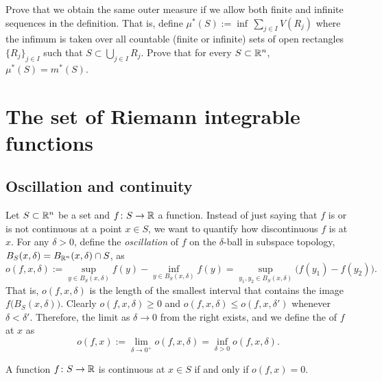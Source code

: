 \begin{exercise} \label{exercise:allowfiniteseqsinoutermeasure}
Prove that we obtain the same outer measure if we allow both finite and
infinite sequences in
the definition.  That is, define $\mu^*(S) := \inf\, \sum_{j \in I} V(R_j)$
where the infimum is taken over all countable (finite or infinite) sets of
open rectangles $\{ R_j \}_{j\in I}$ such that $S \subset
\bigcup_{j \in I} R_j$.  Prove that for every $S \subset {\mathbb{R}}^n$,
$\mu^*(S) = m^*(S)$.
\end{exercise}



\sectionnewpage
\section{The set of Riemann integrable functions }
\label{sec:riemannlebesgue}


\subsection{Oscillation and continuity}

Let $S \subset {\mathbb{R}}^n$ be a set and $f \colon S \to {\mathbb{R}}$ a function.
Instead of just saying that $f$ is or is not continuous at
a point $x \in S$,
we want to quantify how discontinuous $f$ is 
at $x$.  For any $\delta > 0$, define the \emph{oscillation} of 
$f$ on the $\delta$-ball in subspace topology,
$B_S(x,\delta) = B_{{\mathbb{R}}^n}(x,\delta) \cap S$, as
\begin{equation*}
o(f,x,\delta) :=
{\sup_{y \in B_S(x,\delta)} f(y)}
-
{\inf_{y \in B_S(x,\delta)} f(y)}
= 
\sup_{y_1,y_2 \in B_S(x,\delta)} \bigl(f(y_1)-f(y_2)\bigr) .
\end{equation*}
That is, $o(f,x,\delta)$ is the length of the smallest interval
that contains the image $f\bigl(B_S(x,\delta)\bigr)$.
Clearly $o(f,x,\delta) \geq 0$ and
$o(f,x,\delta) \leq o(f,x,\delta')$ whenever $\delta < \delta'$.
Therefore, the limit as $\delta \to 0$ from the right exists, and
we define the \emph{} of $f$
at $x$ as
\begin{equation*}
o(f,x) :=
\lim_{\delta \to 0^+}
o(f,x,\delta) =
\inf_{\delta > 0}
o(f,x,\delta) .
\end{equation*}

\begin{prop}
A function
$f \colon S \to {\mathbb{R}}$ is continuous at $x \in S$ if and only if $o(f,x) = 0$.
\end{prop}

